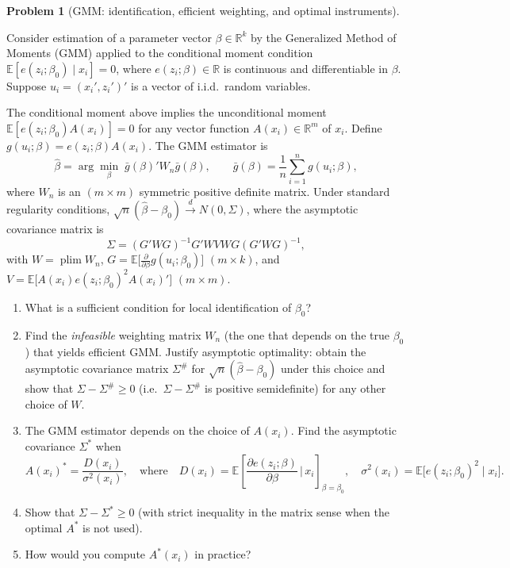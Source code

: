 \documentclass[12pt]{article}
\newcommand{\R}{\mathbb R}
\newcommand{\E}{\mathbb E}
\DeclareMathOperator*{\plim}{plim}
\theoremstyle{definition}
\newtheorem{problem}{Problem}
\theoremstyle{plain}
\begin{document}
\begin{problem}[GMM: identification, efficient weighting, and optimal instruments]
\label{prob:gmm-optimal}

Consider estimation of a parameter vector $\beta \in \R^k$ by the Generalized Method of Moments (GMM) applied to the conditional moment condition $\E[e(z_i; \beta_0) \mid x_i] = 0$, where $e(z_i; \beta) \in \R$ is continuous and differentiable in $\beta$. Suppose $u_i = (x_i', z_i')'$ is a vector of i.i.d.\ random variables.

The conditional moment above implies the unconditional moment $\E[e(z_i; \beta_0) A(x_i)] = 0$ for any vector function $A(x_i) \in \R^m$ of $x_i$. Define $g(u_i; \beta) = e(z_i; \beta) A(x_i)$. The GMM estimator is
\[
\hat{\beta} = \arg\min_{\beta} \; \bar{g}(\beta)' W_n \bar{g}(\beta), \qquad \bar{g}(\beta) = \frac{1}{n} \sum_{i=1}^n g(u_i; \beta),
\]
where $W_n$ is an $(m \times m)$ symmetric positive definite matrix. Under standard regularity conditions, $\sqrt{n}(\hat{\beta} - \beta_0) \xrightarrow{d} N(0, \Sigma)$, where the asymptotic covariance matrix is
\[
\Sigma = (G' W G)^{-1} G' W V W G (G' W G)^{-1},
\]
with $W = \plim W_n$, $G = \E\bigl[ \frac{\partial}{\partial \beta} g(u_i; \beta_0) \bigr]$ $(m \times k)$, and $V = \E\bigl[ A(x_i) e(z_i; \beta_0)^2 A(x_i)' \bigr]$ $(m \times m)$.

\begin{enumerate}[label=(\alph*)]
\item What is a sufficient condition for local identification of $\beta_0$?
\item Find the \emph{infeasible} weighting matrix $W_n$ (the one that depends on the true $\beta_0$) that yields efficient GMM. Justify asymptotic optimality: obtain the asymptotic covariance matrix $\Sigma^\#$ for $\sqrt{n}(\hat{\beta} - \beta_0)$ under this choice and show that $\Sigma - \Sigma^\# \geq 0$ (i.e.\ $\Sigma - \Sigma^\#$ is positive semidefinite) for any other choice of $W$.
\item The GMM estimator depends on the choice of $A(x_i)$. Find the asymptotic covariance $\Sigma^*$ when
\[
A(x_i)^* = \frac{D(x_i)}{\sigma^2(x_i)}, \quad \text{where} \quad D(x_i) = \E\!\left[ \frac{\partial e(z_i; \beta)}{\partial \beta} \,\bigg|\, x_i \right]_{\beta = \beta_0}, \quad \sigma^2(x_i) = \E\bigl[ e(z_i; \beta_0)^2 \mid x_i \bigr].
\]
\item Show that $\Sigma - \Sigma^* \geq 0$ (with strict inequality in the matrix sense when the optimal $A^*$ is not used).
\item How would you compute $A^*(x_i)$ in practice?
\end{enumerate}
\end{problem}
\end{document}
